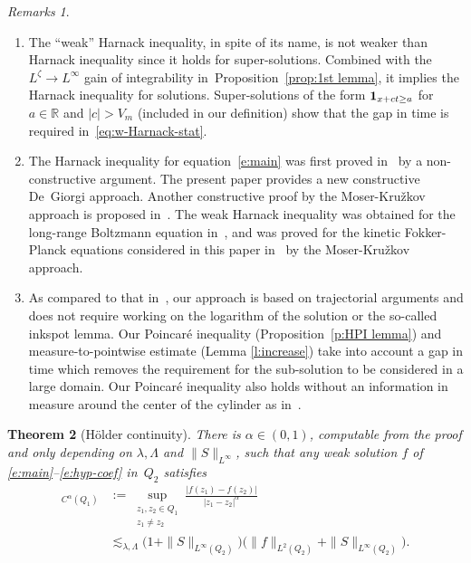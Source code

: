 \documentclass[11pt]{article}
\newcommand{\skpt}{\smallskip}
\numberwithin{equation}{section}\let\oldbigcup\bigcup
\newtheorem{theorem}{Theorem}
\theoremstyle{definition}
\theoremstyle{remark}
\newtheorem{remarks}[theorem]{Remarks}
\begin{document}
\skpt
\begin{remarks}
\begin{enumerate}
\item The ``weak'' Harnack inequality, in spite of its name, is
not weaker than Harnack inequality since it holds for
super-solutions. Combined with the $L^{\zeta} \to L^\infty$
gain of integrability in~Proposition~\ref{prop:1st lemma}, it
implies the Harnack inequality for solutions. Super-solutions
of the form ${\bf 1}_{x+ct\ge a}$ for $a\in \mathbb{R}$ and
$|c|>V_m$ (included in our definition) show that the gap in
time is required in~\eqref{eq:w-Harnack-stat}.
\item The Harnack inequality for equation~\eqref{e:main} was
first proved in~\cite{gimv} by a non-constructive argument. The
present paper provides a new constructive De~Giorgi
approach. Another constructive proof by the Moser-Kru\v{z}kov
approach is proposed in~\cite{Guerand-Imbert}. The weak Harnack
inequality was obtained for the long-range Boltzmann equation
in~\cite{MR4049224}, and was proved for the kinetic
Fokker-Planck equations considered in this paper
in~\cite{Guerand-Imbert} by the Moser-Kru\v{z}kov approach.
\item As compared to that in~\cite{Guerand-Imbert}, our approach
is based on trajectorial arguments and does not require working
on the logarithm of the solution or the so-called inkspot
lemma. Our Poincaré inequality (Proposition~\ref{p:HPI
lemma}) and measure-to-pointwise estimate (Lemma
\ref{l:increase}) take into account a gap in time which removes
the requirement for the sub-solution to be considered in a
large domain. Our Poincaré inequality also holds without an
information in measure around the center of the cylinder as
in~\cite{Guerand-Imbert}.
\end{enumerate}
\end{remarks}

\begin{theorem}[Hölder continuity]
\label{t:holder}
There is $\alpha \in (0,1)$, computable from the proof and only
depending on $\lambda, \Lambda$ and $\|S\|_{L^{\infty}}$, such
that any weak solution $f$ of \eqref{e:main}--\eqref{e:hyp-coef}
in~$Q_2$ satisfies\vspace*{-3pt}
\begin{align*}
[f]_{C^\alpha (Q_{1})}
& := \sup_{\substack{z_1,z_2 \in Q_1\\ z_1 \not =
z_2}} \frac{|f(z_1) - f(z_2)|}{|z_1-z_2|^{\alpha}} \\
& \lesssim_{\lambda,\Lambda}
\bigl(1+\|S\|_{L^\infty(Q_2)} \bigr)
\bigl( \|f\|_{L^2 (Q_2)} + \|S\|_{L^\infty(Q_2)} \bigr).
\end{align*}
\end{theorem}
\end{document}
